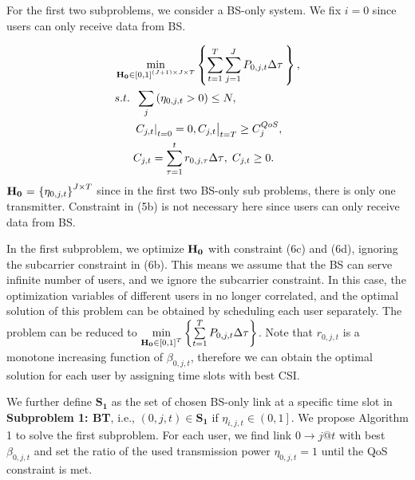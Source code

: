 \documentclass{ieeeaccess}
\begin{document}
For the first two subproblems, we consider a BS-only system. We fix $i = 0$ since users can only receive data from BS.

\begin{subequations}
\begin{align}
& \mathop {\min }\limits_{{\mathbf{{\rm H}}}_{\mathbf{0}} \in {{\left[ {0,1} \right]}^{\left( {J + 1} \right) \times J \times T}}} \left\{ {\sum\limits_{t = 1}^T {\sum\limits_{j = 1}^J {{P_{0,j,t}}\Delta \tau } \,} } \right\} ,\\
& {s.t.} \;\; \sum\limits_j  {\left( {{\eta _{0,j,t}} > 0} \right)}   \le N, \\
& \;\;\;\;\;\; {\left. {{{\left. {{C_{j,t}}} \right|}_{t = 0}} = 0, {C_{j,t}}} \right|_{t = T}} \ge C_j^{QoS}, \\
& \;\;\;\;\;\; {C_{j,t}} = \sum\limits_{\tau  = 1}^t {{r_{0,j,\tau }}\Delta \tau } ,\; {C_{j,t}} \ge 0.
\end{align}
\end{subequations}
${{\mathbf{{\rm H}}}_{\mathbf{0}}}{\text{ = }}{\left\{ {{\eta _{0,j,t}}} \right\}^{J \times T}}$ since in the first two BS-only sub problems, there is only one transmitter. 
Constraint in (5b) is not necessary here since users can only receive data from BS.

In the first subproblem, we optimize ${{\mathbf{{\rm H}}}_{\mathbf{0}}}$ with constraint (6c) and (6d), ignoring the subcarrier constraint in (6b). This means we assume that the BS can serve infinite number of users, and we ignore the subcarrier constraint. In this case, the optimization variables of different users in no longer correlated, and the optimal solution of this problem can be obtained by scheduling each user separately. The problem can be reduced to $\mathop {\min }\limits_{{{\mathbf{{\rm H}}}_{\mathbf{0}}} \in {{\left[ {0,1} \right]}^T}} \left\{ {\sum\limits_{t = 1}^T {{P_{0,j,t}}\Delta \tau } } \right\}$. Note that ${r_{0,j,t}}$ is a monotone increasing function of ${\beta _{0,j,t}}$, therefore we can obtain the optimal solution for each user by assigning time slots with best CSI. 

We further define ${{\mathbf{S}}_{\mathbf{1}}}$ as the set of chosen BS-only link at a specific time slot in \textbf{Subproblem 1: BT}, i.e., $\left( {0,j,t} \right) \in {\mathbf{S}}_{\mathbf{1}}$ if ${\eta _{i,j,t}} \in \left( {0,1} \right]$. We propose Algorithm 1 to solve the first subproblem.
For each user, we find link $0 \to j@t$ with best ${\beta _{0,j,t}}$ and set the ratio of the used transmission power ${\eta _{0,j,t} = 1}$ until the QoS constraint is met.
\end{document}
